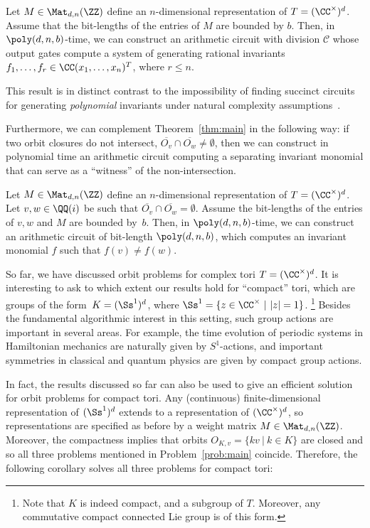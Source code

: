 \begin{corollary}\label{cor:1.3}
Let $M \in\Mat_{d,n}(\ZZ)$ define an $n$-dimensional representation of $T = (\CC^\times)^d$. Assume that the bit-lengths of the entries of $M$ are bounded by $b$.  Then, in $\poly(d,n,b)$-time, we can construct an arithmetic circuit with division $\mathcal{C}$ whose output gates compute a system of generating rational invariants $f_1,\dots,f_r \in \CC(x_1,\dots,x_n)^T$, where $r \leq n$.
\end{corollary}

This result is in distinct contrast to the impossibility of finding succinct circuits for generating \emph{polynomial} invariants under natural complexity assumptions~\cite{GIMOWW}.

Furthermore, we can complement Theorem~\ref{thm:main} in the following way:
if two orbit closures do not intersect, $\overline{O_v} \cap \overline{O_w} \ne \emptyset$,
then we can construct in polynomial time an arithmetic circuit computing a separating invariant monomial that can serve as a ``witness'' of the non-intersection.

\begin{corollary}\label{cor:sep-invar}
Let $M \in\Mat_{d,n}(\ZZ)$ define an $n$-dimensional representation of $T = (\CC^\times)^d$.
%
%
Let $v,w \in \QQ(i)$ be such that $\overline{O_v} \cap \overline{O_w} = \emptyset$.
Assume the bit-lengths of the entries of $v,w$ and $M$ are bounded by~$b$.
Then, in $\poly(d,n,b)$-time, we can construct an arithmetic circuit of bit-length $\poly(d,n,b)$,
which computes an invariant monomial $f$ such that $f(v) \neq f(w)$.
\end{corollary}

%
%
%
So far, we have discussed orbit problems for complex tori $T = (\CC^\times)^d$.
It is interesting to ask to which extent our results hold for ``compact'' tori, which are groups of the form~$K = (\Ss^1)^d$, where $\Ss^1 = \{z \in \CC^\times \ | \ |z| = 1\}$.
\footnote{Note that $K$ is indeed compact, and a subgroup of $T$. Moreover, any commutative compact connected Lie group is of this form.}
Besides the fundamental algorithmic interest in this setting, such group actions are important in several areas.
For example, the time evolution of periodic systems in Hamiltonian mechanics are naturally given by $S^1$-actions, and important symmetries in classical and quantum physics are given by compact group actions.

In fact, the results discussed so far can also be used to give an efficient solution for orbit problems for compact tori.
Any (continuous) finite-dimensional representation of $(\Ss^1)^d$ extends to a representation of $(\CC^\times)^d$, so representations are specified as before by a weight matrix $M \in\Mat_{d,n}(\ZZ)$.
Moreover, the compactness implies that orbits $O_{K,v} = \{kv \ |\ k \in K\}$ are closed and so all three problems mentioned in Problem~\ref{prob:main} coincide.
Therefore, the following corollary solves all three problems for compact tori:

